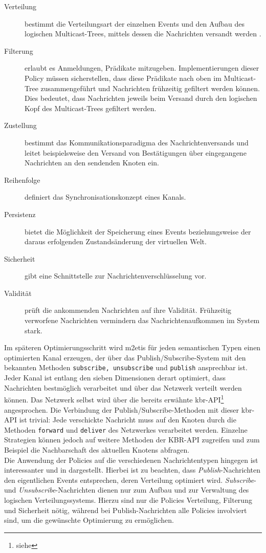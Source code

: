 \begin{description}
\item[Verteilung] bestimmt die Verteilungsart der einzelnen Events und den Aufbau des logischen Multicast-Trees, mittels dessen die Nachrichten versandt werden \cite{KostasKatrinis2005}.
\item[Filterung] erlaubt es Anmeldungen, Prädikate mitzugeben. Implementierungen dieser Policy müssen sicherstellen, dass diese Prädikate nach oben im Multicast-Tree zusammengeführt und Nachrichten frühzeitig gefiltert werden können. Dies bedeutet, dass Nachrichten jeweils beim Versand durch den logischen Kopf des Multicast-Trees gefiltert werden.
\item[Zustellung] bestimmt das Kommunikationsparadigma des Nachrichtenversands und leitet beispielsweise den Versand von Bestätigungen über eingegangene Nachrichten an den sendenden Knoten ein.
\item[Reihenfolge] definiert das Synchronisationskonzept eines Kanals.
\item[Persistenz] bietet die Möglichkeit der Speicherung eines Events beziehungsweise der daraus erfolgenden Zustandsänderung der virtuellen Welt.
\item[Sicherheit] gibt eine Schnittstelle zur Nachrichtenverschlüsselung vor.
\item[Validität] prüft die ankommenden Nachrichten auf ihre Validität. Frühzeitig verworfene Nachrichten vermindern das Nachrichtenaufkommen im System stark.
\end{description}

Im späteren Optimierungsschritt wird \ac{m2etis} für jeden semantischen Typen einen optimierten Kanal erzeugen, der über das Publish/Subscribe-System mit den bekannten Methoden \texttt{subscribe, unsubscribe} und \texttt{publish} ansprechbar ist. Jeder Kanal ist entlang den sieben Dimensionen derart optimiert, dass Nachrichten bestmöglich verarbeitet und über das Netzwerk verteilt werden können. Das Netzwerk selbst wird über die bereits erwähnte \ac{kbr}-API\footnote{siehe } angesprochen. Die Verbindung der Publish/Subscribe-Methoden mit dieser \ac{kbr}-API ist trivial: Jede verschickte Nachricht muss auf den Knoten durch die Methoden \texttt{forward} und \texttt{deliver} des Netzwerkes verarbeitet werden. Einzelne Strategien können jedoch auf weitere Methoden der KBR-API zugreifen und zum Beispiel die Nachbarschaft des aktuellen Knotens abfragen.\\
Die Anwendung der Policies auf die verschiedenen Nachrichtentypen hingegen ist interessanter und in  dargestellt. Hierbei ist zu beachten, dass \emph{Publish}-Nachrichten den eigentlichen Events entsprechen, deren Verteilung optimiert wird. \emph{Subscribe}- und \emph{Unsubscribe}-Nachrichten dienen nur zum Aufbau und zur Verwaltung des logischen Verteilungssystems. Hierzu sind nur die Policies Verteilung, Filterung und Sicherheit nötig, während bei Publish-Nachrichten alle Policies involviert sind, um die gewünschte Optimierung zu ermöglichen.

